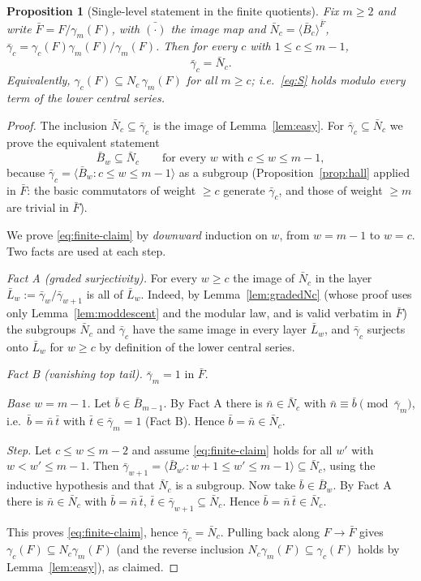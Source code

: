 \documentclass{amsart}
\newtheorem{proposition}{Proposition}
\theoremstyle{definition}
\theoremstyle{remark}
\begin{document}
\begin{proposition}[Single-level statement in the finite quotients]\label{prop:finiteS}
Fix $m\ge 2$ and write $\bar F=F/\gamma_m(F)$, with $\bar{(\cdot)}$ the image map and
$\bar N_c=\langle\bar B_c\rangle^{\bar F}$, $\bar\gamma_c=\gamma_c(F)\gamma_m(F)/\gamma_m(F)$.
Then for every $c$ with $1\le c\le m-1$,
\[
\bar\gamma_c=\bar N_c .
\]
Equivalently, $\gamma_c(F)\subseteq N_c\,\gamma_m(F)$ for all $m\ge c$; i.e.\
\eqref{eq:S} holds modulo every term of the lower central series.
\end{proposition}
\begin{proof}
The inclusion $\bar N_c\subseteq\bar\gamma_c$ is the image of Lemma~\ref{lem:easy}.
For $\bar\gamma_c\subseteq\bar N_c$ we prove the equivalent statement
\begin{equation}\label{eq:finite-claim}
\bar B_w\subseteq\bar N_c\qquad\text{for every }w\text{ with }c\le w\le m-1,
\end{equation}
because $\bar\gamma_c=\langle\bar B_w:c\le w\le m-1\rangle$ as a subgroup
(Proposition~\ref{prop:hall} applied in $\bar F$: the basic commutators of weight
$\ge c$ generate $\bar\gamma_c$, and those of weight $\ge m$ are trivial in
$\bar F$).

We prove \eqref{eq:finite-claim} by \emph{downward} induction on $w$, from $w=m-1$
to $w=c$. Two facts are used at each step.

\emph{Fact A (graded surjectivity).} For every $w\ge c$ the image of $\bar N_c$ in
the layer $\bar L_w:=\bar\gamma_w/\bar\gamma_{w+1}$ is all of $\bar L_w$. Indeed, by
Lemma~\ref{lem:gradedNc} (whose proof uses only Lemma~\ref{lem:moddescent} and the
modular law, and is valid verbatim in $\bar F$) the subgroups $\bar N_c$ and
$\bar\gamma_c$ have the same image in every layer $\bar L_w$, and $\bar\gamma_c$
surjects onto $\bar L_w$ for $w\ge c$ by definition of the lower central series.

\emph{Fact B (vanishing top tail).} $\bar\gamma_m=1$ in $\bar F$.

\emph{Base $w=m-1$.} Let $\bar b\in\bar B_{m-1}$. By Fact A there is
$\bar n\in\bar N_c$ with $\bar n\equiv\bar b\pmod{\bar\gamma_{m}}$, i.e.\
$\bar b=\bar n\,\bar t$ with $\bar t\in\bar\gamma_{m}=1$ (Fact B). Hence
$\bar b=\bar n\in\bar N_c$.

\emph{Step.} Let $c\le w\le m-2$ and assume \eqref{eq:finite-claim} holds for all
$w'$ with $w<w'\le m-1$. Then $\bar\gamma_{w+1}=\langle\bar B_{w'}:w+1\le w'\le
m-1\rangle\subseteq\bar N_c$, using the inductive hypothesis and that
$\bar N_c$ is a subgroup. Now take $\bar b\in\bar B_w$. By Fact A there is
$\bar n\in\bar N_c$ with $\bar b=\bar n\,\bar t$, $\bar t\in\bar\gamma_{w+1}\subseteq
\bar N_c$. Hence $\bar b=\bar n\,\bar t\in\bar N_c$.

This proves \eqref{eq:finite-claim}, hence $\bar\gamma_c=\bar N_c$. Pulling back
along $F\to\bar F$ gives $\gamma_c(F)\subseteq N_c\gamma_m(F)$ (and the reverse
inclusion $N_c\gamma_m(F)\subseteq\gamma_c(F)$ holds by Lemma~\ref{lem:easy}), as
claimed.
\end{proof}
\end{document}
